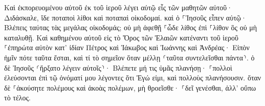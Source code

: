 \documentclass{openreader}
\begin{document}
Καὶ ἐκπορευομένου αὐτοῦ ἐκ τοῦ ἱεροῦ λέγει αὐτῷ εἷς τῶν μαθητῶν αὐτοῦ· Διδάσκαλε, ἴδε ποταποὶ λίθοι καὶ ποταπαὶ οἰκοδομαί. 
καὶ ὁ ⸀Ἰησοῦς εἶπεν αὐτῷ· Βλέπεις ταύτας τὰς μεγάλας οἰκοδομάς; οὐ μὴ ἀφεθῇ ⸀ὧδε λίθος ἐπὶ ⸀λίθον ὃς οὐ μὴ καταλυθῇ. 
Καὶ καθημένου αὐτοῦ εἰς τὸ Ὄρος τῶν Ἐλαιῶν κατέναντι τοῦ ἱεροῦ ⸀ἐπηρώτα αὐτὸν κατ’ ἰδίαν Πέτρος καὶ Ἰάκωβος καὶ Ἰωάννης καὶ Ἀνδρέας· 
Εἰπὸν ἡμῖν πότε ταῦτα ἔσται, καὶ τί τὸ σημεῖον ὅταν μέλλῃ ⸂ταῦτα συντελεῖσθαι πάντα⸃. 
ὁ δὲ Ἰησοῦς ⸂ἤρξατο λέγειν αὐτοῖς⸃· Βλέπετε μή τις ὑμᾶς πλανήσῃ· 
⸀πολλοὶ ἐλεύσονται ἐπὶ τῷ ὀνόματί μου λέγοντες ὅτι Ἐγώ εἰμι, καὶ πολλοὺς πλανήσουσιν. 
ὅταν δὲ ⸀ἀκούσητε πολέμους καὶ ἀκοὰς πολέμων, μὴ θροεῖσθε· ⸀δεῖ γενέσθαι, ἀλλ’ οὔπω τὸ τέλος. 
\end{document}
